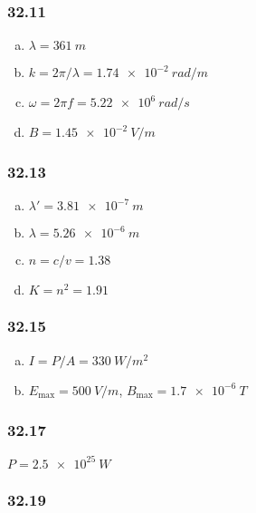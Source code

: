 \documentclass{article}
\begin{document}
\subsubsection{32.11}

\begin{enumerate}[(a)]
  \item $\lambda = \qty{361}{m}$

  \item $k = 2 \pi / \lambda = \qty{1.74e-2}{rad/m}$

  \item $\omega = 2 \pi f = \qty{5.22e6}{rad/s}$

  \item $B = \qty{1.45e-2}{V/m}$
\end{enumerate}

\subsubsection{32.13}

\begin{enumerate}[(a)]
  \item $\lambda' = \qty{3.81e-7}{m}$

  \item $\lambda = \qty{5.26e-6}{m}$

  \item $n = c / v = 1.38$

  \item $K = n^2 = 1.91$
\end{enumerate}

\subsubsection{32.15}

\begin{enumerate}[(a)]
  \item $I = P / A = \qty{330}{W/m^2}$

  \item $E_\text{max} = \qty{500}{V/m}$, $B_\text{max} = \qty{1.7e-6}{T}$
\end{enumerate}

\subsubsection{32.17}

$P = \qty{2.5e25}{W}$

\subsubsection{32.19}
\end{document}
